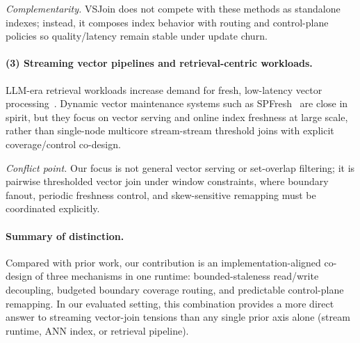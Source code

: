 \textit{Complementarity.} VSJoin does not compete with these methods as standalone indexes; instead, it composes index behavior with routing and control-plane policies so quality/latency remain stable under update churn.

\paragraph{(3) Streaming vector pipelines and retrieval-centric workloads.}
LLM-era retrieval workloads increase demand for fresh, low-latency vector processing~\cite{lewis2020rag}. Dynamic vector maintenance systems such as SPFresh~\cite{xu2023spfresh} are close in spirit, but they focus on vector serving and online index freshness at large scale, rather than single-node multicore stream-stream threshold joins with explicit coverage/control co-design.

\textit{Conflict point.} Our focus is not general vector serving or set-overlap filtering; it is pairwise thresholded vector join under window constraints, where boundary fanout, periodic freshness control, and skew-sensitive remapping must be coordinated explicitly.

\paragraph{Summary of distinction.}
Compared with prior work, our contribution is an implementation-aligned co-design of three mechanisms in one runtime: bounded-staleness read/write decoupling, budgeted boundary coverage routing, and predictable control-plane remapping. In our evaluated setting, this combination provides a more direct answer to streaming vector-join tensions than any single prior axis alone (stream runtime, ANN index, or retrieval pipeline).
